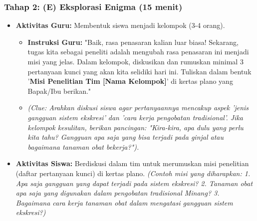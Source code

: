 \documentclass[a4paper,12pt]{article}
\begin{document}
\subsubsection{Tahap 2: (E) Eksplorasi Enigma (15 menit)}
\begin{itemize}
\item \textbf{Aktivitas Guru:} Membentuk siswa menjadi kelompok (3-4 orang).
    \begin{itemize}
    \item \textbf{Instruksi Guru:} "Baik, rasa penasaran kalian luar biasa! Sekarang, tugas kita sebagai peneliti adalah mengubah rasa penasaran ini menjadi misi yang jelas. Dalam kelompok, diskusikan dan rumuskan minimal 3 pertanyaan kunci yang akan kita selidiki hari ini. Tuliskan dalam bentuk '\textbf{Misi Penelitian Tim [Nama Kelompok]}' di kertas plano yang Bapak/Ibu berikan."
    \item \textit{(Clue: Arahkan diskusi siswa agar pertanyaannya mencakup aspek 'jenis gangguan sistem ekskresi' dan 'cara kerja pengobatan tradisional'. Jika kelompok kesulitan, berikan pancingan: "Kira-kira, apa dulu yang perlu kita tahu? Gangguan apa saja yang bisa terjadi pada ginjal atau bagaimana tanaman obat bekerja?").}
    \end{itemize}
\item \textbf{Aktivitas Siswa:} Berdiskusi dalam tim untuk merumuskan misi penelitian (daftar pertanyaan kunci) di kertas plano. \textit{(Contoh misi yang diharapkan: 1. Apa saja gangguan yang dapat terjadi pada sistem ekskresi? 2. Tanaman obat apa saja yang digunakan dalam pengobatan tradisional Minang? 3. Bagaimana cara kerja tanaman obat dalam mengatasi gangguan sistem ekskresi?)}
\end{itemize}
\end{document}
